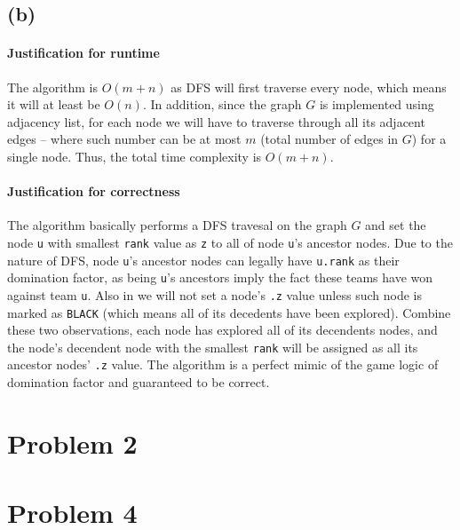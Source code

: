 \documentclass[11pt]{article}
\newcommand{\ilc}{\texttt}
\begin{document}
\subsection{(b)}

\paragraph{Justification for runtime} The algorithm is $O(m+n)$ as DFS will first traverse every node, which means it will at least be $O(n)$. In addition, since the graph $G$ is implemented using adjacency list, for each node we will have to traverse through all its adjacent edges -- where such number can be at most $m$ (total number of edges in $G$) for a single node. Thus, the total time complexity is $O(m + n)$.

\paragraph{Justification for correctness} The algorithm basically performs a DFS travesal on the graph $G$ and set the node \ilc{u} with smallest \ilc{rank} value as \ilc{z} to all of node \ilc{u}'s ancestor nodes. Due to the nature of DFS, node \ilc{u}'s ancestor nodes can legally have \ilc{u.rank} as their domination factor, as being \ilc{u}'s ancestors imply the fact these teams have won against team \ilc{u}. Also in  we will not set a node's \ilc{.z} value unless such node is marked as \ilc{BLACK} (which means all of its decedents have been explored). Combine these two observations, each node has explored all of its decendents nodes, and the node's decendent node with the smallest \ilc{rank} will be assigned as all its ancestor nodes' \ilc{.z} value. The algorithm is a perfect mimic of the game logic of domination factor and guaranteed to be correct.


\section{Problem 2}

\section{Problem 4}

%
% 
% 
\end{document}
